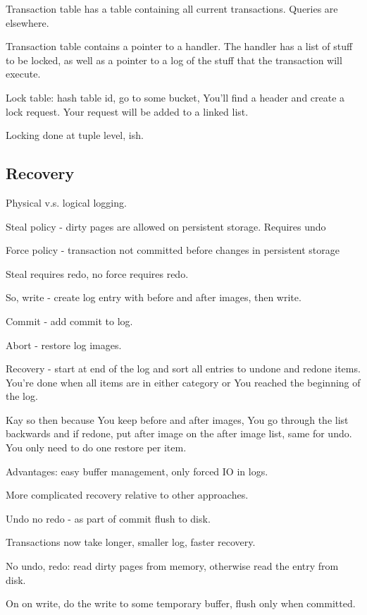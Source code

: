 \documentclass{article}
\begin{document}
		Transaction table has a table containing all current transactions. Queries are elsewhere.
	
		Transaction table contains a pointer to a handler. The handler has a list of stuff to be locked, as well as a pointer to a log of the stuff that the transaction will execute.
		
		Lock table: hash table id, go to some bucket, You'll find a header and create a lock request. Your request will be added to a linked list. 
		
		Locking done at tuple level, ish. 
		
	\subsection{Recovery}
	
		Physical v.s. logical logging.
		
		Steal policy - dirty pages are allowed on persistent storage. Requires undo
		
		Force policy - transaction not committed before changes in persistent storage
		
		Steal requires redo, no force requires redo.
		
		So, write - create log entry with before and after images, then write.
		
		Commit - add commit to log.
		
		Abort - restore log images.
		
		Recovery - start at end of the log and sort all entries to undone and redone items. You're done when all items are in either category or You reached the beginning of the log.
		
		Kay so then because You keep before and after images, You go through the list backwards and if redone, put after image on the after image list, same for undo. You only need to do one restore per item.
		
		Advantages: easy buffer management, only forced IO in logs.
		
		More complicated recovery relative to other approaches.
		
		Undo no redo - as part of commit flush to disk.
		
		Transactions now take longer, smaller log, faster recovery.
		
		No undo, redo: read dirty pages from memory, otherwise read the entry from disk.
		
		On on write, do the write to some temporary buffer, flush only when committed.
		
\end{document}
